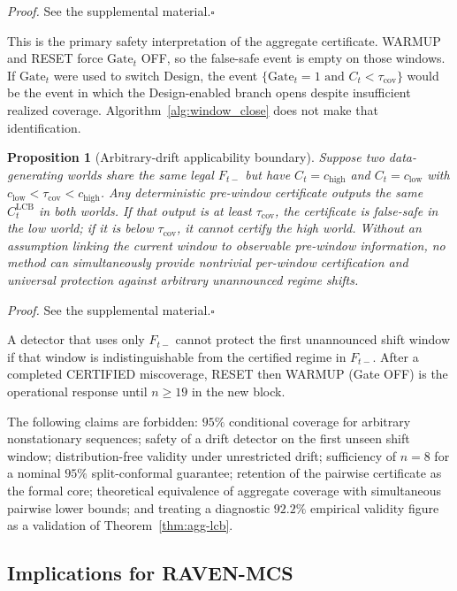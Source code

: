 \documentclass[letterpaper,journal]{IEEEtran}
\newtheorem{proposition}{Proposition}
\begin{document}
\noindent\emph{Proof.}
See the supplemental material.\hfill$\square$

This is the primary safety interpretation of the aggregate certificate.
WARMUP and RESET force $\mathrm{Gate}_t$ OFF, so the false-safe event is empty
on those windows.
If $\mathrm{Gate}_t$ were used to switch Design, the event
$\{\mathrm{Gate}_t=1\text{ and }C_t<\tau_{\mathrm{cov}}\}$ would be the
event in which the Design-enabled branch opens despite insufficient
realized coverage.  Algorithm~\ref{alg:window_close} does not make that
identification.

\begin{proposition}[Arbitrary-drift applicability boundary]
\label{prop:drift-boundary}
Suppose two data-generating worlds share the same legal $F_{t-}$ but have
$C_t=c_{\mathrm{high}}$ and $C_t=c_{\mathrm{low}}$ with
$c_{\mathrm{low}}<\tau_{\mathrm{cov}}<c_{\mathrm{high}}$.  Any deterministic
pre-window certificate outputs the same $C^{\mathrm{LCB}}_t$ in both worlds.
If that output is at least $\tau_{\mathrm{cov}}$, the certificate is
false-safe in the low world; if it is below $\tau_{\mathrm{cov}}$, it cannot
certify the high world.  Without an assumption linking the current window to
observable pre-window information, no method can simultaneously provide
nontrivial per-window certification and universal protection against
arbitrary unannounced regime shifts.
\end{proposition}

\noindent\emph{Proof.}
See the supplemental material.\hfill$\square$

A detector that uses only $F_{t-}$ cannot protect the first unannounced
shift window if that window is indistinguishable from the certified regime in
$F_{t-}$.  After a completed CERTIFIED miscoverage, RESET then WARMUP
(Gate OFF) is the operational response until $n\ge 19$ in the new block.

The following claims are forbidden: $95\%$ conditional coverage for arbitrary
nonstationary sequences; safety of a drift detector on the first unseen shift
window; distribution-free validity under unrestricted drift; sufficiency of
$n=8$ for a nominal $95\%$ split-conformal guarantee; retention of the pairwise
certificate as the formal core; theoretical equivalence of aggregate coverage
with simultaneous pairwise lower bounds; and treating a diagnostic $92.2\%$
empirical validity figure as a validation of Theorem~\ref{thm:agg-lcb}.

\subsection{Implications for RAVEN-MCS}
\label{subsec:theory_implications}
\end{document}
